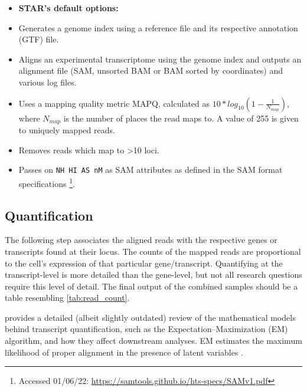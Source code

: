
\begin{itemize}\itemsep0em
\item[] \textbf{STAR's default options:}
\item Generates a genome index using a reference file and its respective annotation (GTF) file.
\item Aligns an experimental transcriptome using the genome index and outputs an alignment file (SAM, unsorted BAM or BAM sorted by coordinates) and various log files.
\item Uses a mapping quality metric MAPQ, calculated as $10*log_{10}(1-\frac{1}{N_{map}})$, where ${N_{map}}$ is the number of places the read maps to. A value of 255 is given to uniquely mapped reads.
\item Removes reads which map to >10 loci.
\item Passes on \texttt{NH HI AS nM} as SAM attributes as defined in the SAM format specifications \footnote{Accessed 01/06/22: \url{https://samtools.github.io/hts-specs/SAMv1.pdf}}.
\end{itemize}


\subsection{Quantification}
\label{quantification}
The following step associates the aligned reads with the respective genes or transcripts found at their locus. The counts of the mapped reads are proportional to the cell's expression of that particular gene/transcript. Quantifying at the transcript-level is more detailed than the gene-level, but not all research questions require this level of detail. The final output of the combined samples should be a table resembling \autoref{tab:read_count}.

\cite{pachter2011models} provides a detailed (albeit slightly outdated) review of the mathematical models behind transcript quantification, such as the Expectation–Maximization (EM) algorithm, and how they affect downstream analyses. EM estimates the maximum likelihood of proper alignment in the presence of latent variables \citep{brownlee2019gentle, pachter2011models}.

